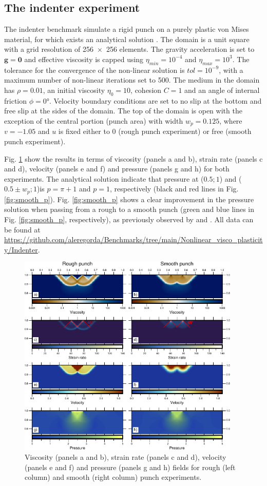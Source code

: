 \documentclass[hidelinks,10pt,a4paper]{article}
\begin{document}
\subsection{The indenter experiment}\label{sec:indenter}
The indenter benchmark simulate a rigid punch on a purely plastic von Mises material, for which exists an analytical solution
\citep{Thieulot2008,Thieulot2014,Glerum2018}. The domain is a unit square with a grid resolution of \num{256x256} elements. The gravity acceleration is set
to $\bm{g}=\bm{0}$ and effective viscosity is capped using $\eta_{min}=10^{-4}$ and $\eta_{max}=10^3$. The tolerance for the convergence of the non-linear
solution is $tol=10^{-9}$, with a maximum number of non-linear iterations set to 500. The medium in the domain has $\rho=0.01$, an initial viscosity
$\eta_0=10$, cohesion $C=1$ and an angle of internal friction $\phi=0$°. Velocity boundary conditions are set to no slip at the bottom and free slip at the
sides of the domain. The top of the domain is open with the exception of the central portion (punch area) with width $w_p=0.125$, where $v=-1.05$ and $u$ is
fixed either to 0 (rough punch experiment) or free (smooth punch experiment).

Fig. \ref{fig:indenter} show the results in terms of viscosity (panels a and b), strain rate (panels c and d), velocity (panels e and f) and pressure
(panels g and h) for both experiments. The analytical solution indicate that pressure at ($0.5;1$) and ($0.5 \pm w_p;1$)is $p=\pi +1$ and $p=1$, respectively
(black and red lines in Fig. \ref{fig:smooth_p}). Fig. \ref{fig:smooth_p} shows a clear improvement in the pressure solution when passing from a rough to a
smooth punch (green and blue lines in Fig. \ref{fig:smooth_p}, respectively), as previously observed by \citet{Thieulot2014} and \citet{Glerum2018}. 
All data can be found at \url{https://github.com/aleregorda/Benchmarks/tree/main/Nonlinear_visco_plasticity/Indenter}.

\begin{figure}
\centering
\noindent\includegraphics[width=400px]{./Figures/Indenter.pdf}
\caption{Viscosity (panels a and b), strain rate (panels c and d), velocity (panels e and f) and pressure (panels g and h) fields for rough (left column) and
smooth (right column) punch experiments.}
\label{fig:indenter}
\end{figure}
\end{document}

